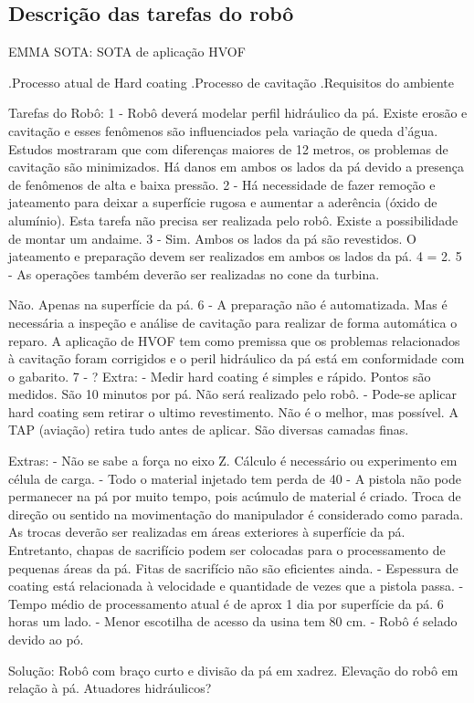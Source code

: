 \subsection{Descrição das tarefas do robô}


EMMA SOTA: SOTA de aplicação HVOF

.Processo atual de Hard coating
.Processo de cavitação
.Requisitos do ambiente

Tarefas do Robô:
1 - Robô deverá modelar perfil hidráulico da pá. Existe erosão e cavitação e
esses fenômenos são influenciados pela variação de queda d'água. Estudos
mostraram que com diferenças maiores de 12 metros, os problemas de cavitação são
minimizados. Há danos em ambos os lados da pá devido a presença de
fenômenos de alta e baixa pressão.
2 - Há necessidade de fazer remoção e jateamento para deixar a superfície rugosa
e aumentar a aderência (óxido de alumínio). Esta tarefa não precisa ser
realizada pelo robô. Existe a possibilidade de montar um andaime.
3 - Sim. Ambos os lados da pá são revestidos. O jateamento e preparação devem
ser realizados em ambos os lados da pá.
4 = 2.
5 - As operações também deverão ser realizadas no
cone da turbina.

Não. Apenas na superfície da pá.
6 - A preparação não é automatizada. Mas é necessária a inspeção e análise de
cavitação para realizar de forma automática o reparo. A aplicação de HVOF tem
como premissa que os problemas relacionados à cavitação foram corrigidos e o
peril hidráulico da pá está em conformidade com o gabarito.
7 - ? Extra: - Medir hard coating é simples e rápido. Pontos são medidos. São 10
minutos por pá. Não será realizado pelo robô.
- Pode-se aplicar hard coating sem retirar o ultimo revestimento. Não é o
melhor, mas possível. A TAP (aviação) retira tudo antes de aplicar. São diversas
camadas finas.


Extras:
- Não se sabe a força no eixo Z. Cálculo é necessário ou experimento em célula
de carga.
- Todo o material injetado tem perda de 40%
- A pistola não pode permanecer na pá por muito tempo, pois acúmulo de material
é criado. Troca de direção ou sentido na movimentação do manipulador é
considerado como parada. As trocas deverão ser realizadas em áreas exteriores à
superfície da pá. Entretanto, chapas de sacrifício podem ser colocadas para o
processamento de pequenas áreas da pá. Fitas de sacrifício não são eficientes
ainda.
- Espessura de coating está relacionada à velocidade e quantidade de vezes que a
pistola passa.
- Tempo médio de processamento atual é de aprox 1 dia por superfície da pá. 6
horas um lado.
- Menor escotilha de acesso da usina tem 80 cm.
- Robô é selado devido ao pó.

Solução: Robô com braço curto e divisão da pá em xadrez. Elevação do robô em relação à pá. Atuadores hidráulicos?
